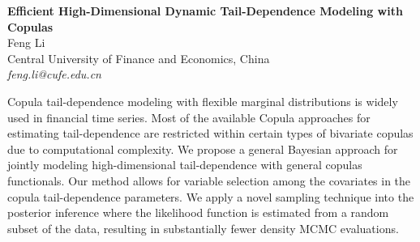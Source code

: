 \documentclass[12pt]{article}
\begin{document}
\pagestyle{empty}
\begin{center}
{\large\bf Efficient High-Dimensional Dynamic Tail-Dependence Modeling with Copulas}
\\[3mm]
Feng Li
\\[4mm]
Central University of Finance and Economics, China\\
{\it feng.li@cufe.edu.cn}\\
\end{center}

\bigskip

 Copula tail-dependence modeling with flexible marginal
distributions is widely used in financial time series. Most of the available Copula
approaches for estimating tail-dependence are restricted within certain types of bivariate
copulas due to computational complexity. We propose a general Bayesian approach for
jointly modeling high-dimensional tail-dependence with general copulas functionals. Our
method allows for variable selection among the covariates in the copula tail-dependence
parameters. We apply a novel sampling technique into the posterior inference where the
likelihood function is estimated from a random subset of the data, resulting in
substantially fewer density MCMC evaluations.

\noindent
\end{document}
